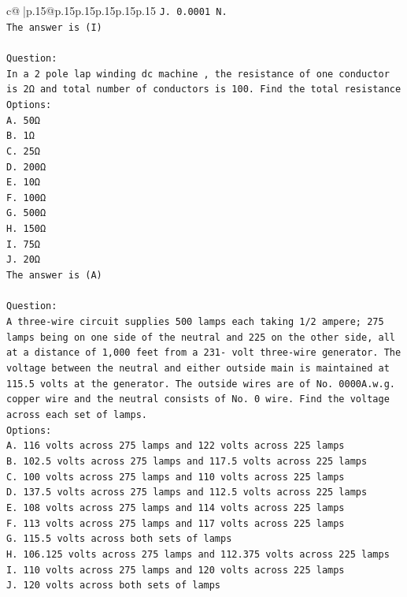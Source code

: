 \documentclass{article}
\begin{document}
{\begin{supertabular}{c@{$\;$}|p{.15\linewidth}@{}p{.15\linewidth}p{.15\linewidth}p{.15\linewidth}p{.15\linewidth}p{.15\linewidth}}
{{{\texttt{J. 0.0001 N.} \\
\texttt{The answer is (I)} \\
\\ 
\texttt{Question:} \\
\texttt{In a 2 pole lap winding dc machine , the resistance of one conductor is 2Ω and total number of conductors is 100. Find the total resistance} \\
\texttt{Options:} \\
\texttt{A. 50Ω} \\
\texttt{B. 1Ω} \\
\texttt{C. 25Ω} \\
\texttt{D. 200Ω} \\
\texttt{E. 10Ω} \\
\texttt{F. 100Ω} \\
\texttt{G. 500Ω} \\
\texttt{H. 150Ω} \\
\texttt{I. 75Ω} \\
\texttt{J. 20Ω} \\
\texttt{The answer is (A)} \\
\\ 
\texttt{Question:} \\
\texttt{A three{-}wire circuit supplies 500 lamps each taking 1/2 ampere; 275 lamps being on one side of the neutral and 225 on the other side, all at a distance of 1,000 feet from a 231{-} volt three{-}wire generator. The voltage between the neutral and either outside main is maintained at 115.5 volts at the generator. The outside wires are of No. 0000A.w.g. copper wire and the neutral consists of No. 0 wire. Find the voltage across each set of lamps.} \\
\texttt{Options:} \\
\texttt{A. 116 volts across 275 lamps and 122 volts across 225 lamps} \\
\texttt{B. 102.5 volts across 275 lamps and 117.5 volts across 225 lamps} \\
\texttt{C. 100 volts across 275 lamps and 110 volts across 225 lamps} \\
\texttt{D. 137.5 volts across 275 lamps and 112.5 volts across 225 lamps} \\
\texttt{E. 108 volts across 275 lamps and 114 volts across 225 lamps} \\
\texttt{F. 113 volts across 275 lamps and 117 volts across 225 lamps} \\
\texttt{G. 115.5 volts across both sets of lamps} \\
\texttt{H. 106.125 volts across 275 lamps and 112.375 volts across 225 lamps} \\
\texttt{I. 110 volts across 275 lamps and 120 volts across 225 lamps} \\
\texttt{J. 120 volts across both sets of lamps} \\
            }
        }
    }
     \\ \\


\end{supertabular}}
\end{document}
